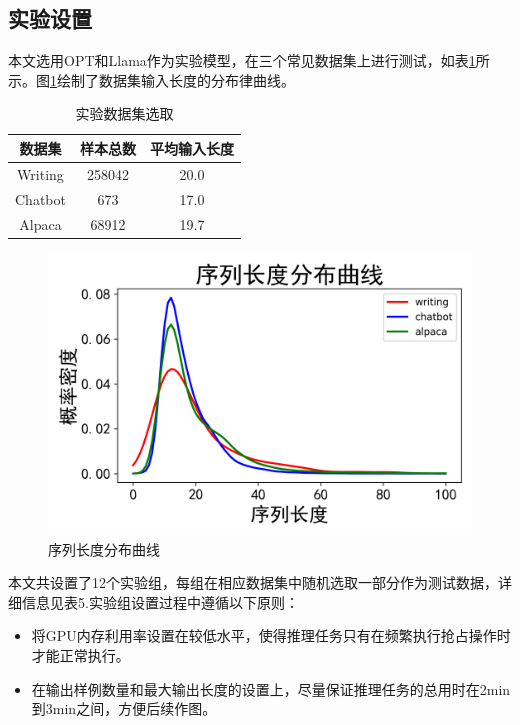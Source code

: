 \documentclass[a4paper, nosysfonts]{hpcchina}
\begin{document}
\subsection{实验设置}
本文选用OPT和Llama作为实验模型，在三个常见数据集上进行测试，如表\ref{实验数据集选取}所示。图\ref{序列长度分布曲线}绘制了数据集输入长度的分布律曲线。
\begin{table}[H]
  \centering
  \caption{实验数据集选取}
  \label{实验数据集选取}
  \begin{tabular}{|c|c|c|} \hline
    \textbf{数据集} & \textbf{样本总数} & \textbf{平均输入长度} \\ \hline
    Writing & 258042 & 20.0 \\ \hline
    Chatbot & 673 & 17.0 \\ \hline
    Alpaca & 68912 & 19.7 \\ \hline
  \end{tabular}
\end{table}

\begin{figure}[!htbp]
  \centering
  \includegraphics[width=0.9\linewidth]
  {序列长度分布曲线.png}
  \caption{序列长度分布曲线}
  \label{序列长度分布曲线}
\end{figure}

本文共设置了12个实验组，每组在相应数据集中随机选取一部分作为测试数据，详细信息见表5.实验组设置过程中遵循以下原则：
\begin{itemize}
  \item 将GPU内存利用率设置在较低水平，使得推理任务只有在频繁执行抢占操作时才能正常执行。
  \item 在输出样例数量和最大输出长度的设置上，尽量保证推理任务的总用时在2min到3min之间，方便后续作图。
\end{itemize}
\end{document}
